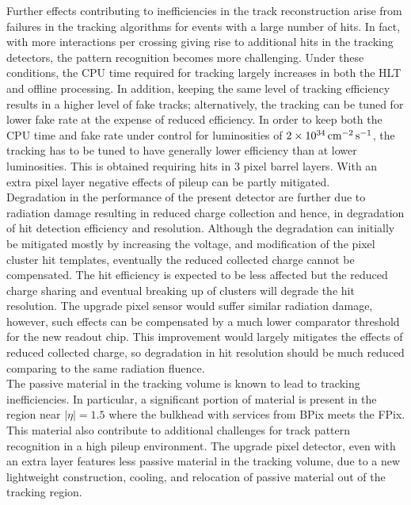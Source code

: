 Further effects contributing to inefficiencies in the track reconstruction arise from failures in the tracking algorithms for events with a large number of hits. In fact, with more interactions per crossing giving rise to additional hits in the tracking detectors, the pattern recognition becomes more challenging. Under these conditions, the CPU time required for tracking largely increases in both the HLT and offline processing. In addition, keeping the same level of tracking efficiency results in a higher level of fake tracks; alternatively, the tracking can be tuned for lower fake rate at the expense of reduced efficiency.
In order to keep both the CPU time and fake rate under control for luminosities of $2\times10^{34}\,\text{cm}^\text{$-$2}\,\text{s}^\text{$-$1}$, the tracking has to be tuned to have generally lower efficiency than at lower luminosities. This is obtained requiring hits in 3 pixel barrel layers. With an extra pixel layer negative effects of pileup can be partly mitigated.\\

Degradation in the performance of the present detector are further due to radiation damage resulting in reduced charge collection and hence, in degradation of hit detection efficiency and resolution.
Although the degradation can initially be mitigated mostly by increasing the voltage, and modification of the pixel cluster hit templates, eventually the reduced collected charge cannot be compensated.
The hit efficiency is expected to be less affected but the reduced charge sharing and eventual breaking up of clusters will degrade the hit resolution. The upgrade pixel sensor would suffer similar radiation damage, however, such effects can be compensated by a much lower comparator threshold for the new readout chip. This improvement would largely mitigates the effects of reduced collected charge, so degradation in hit resolution should be much reduced comparing to the same radiation fluence.\\

The passive material in the tracking volume is known to lead to tracking inefficiencies.
In particular, a significant portion of material is present in the region near $|\eta| = 1.5$ where the bulkhead with services from BPix meets the FPix.
This material also contribute to additional challenges for track pattern recognition in a high pileup environment.
The upgrade pixel detector, even with an extra layer features less passive material in the tracking volume, due to a new lightweight construction, cooling, and relocation of passive material out of the tracking region.

